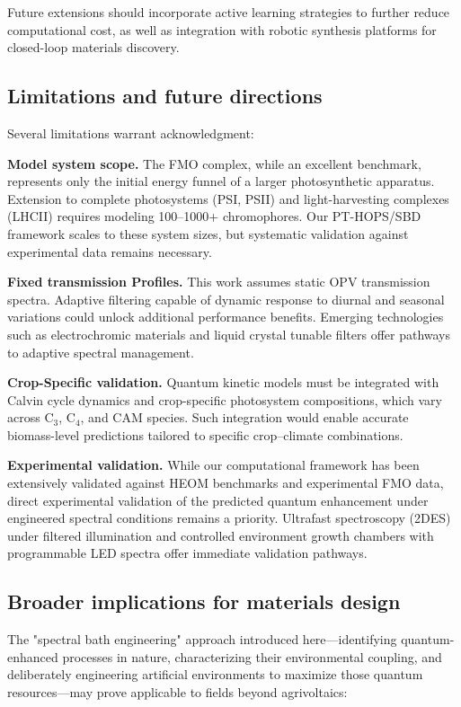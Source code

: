 Future extensions should incorporate active learning strategies to further reduce computational cost, as well as integration with robotic synthesis platforms for closed-loop materials discovery.

\subsection{Limitations and future directions}

Several limitations warrant acknowledgment:

\textbf{Model system scope.} The FMO complex, while an excellent benchmark, represents only the initial energy funnel of a larger photosynthetic apparatus. Extension to complete photosystems (PSI, PSII) and light-harvesting complexes (LHCII) requires modeling \numrange{100}{1000}+ chromophores. Our PT-HOPS/SBD framework scales to these system sizes, but systematic validation against experimental data remains necessary.

\textbf{Fixed transmission Profiles.} This work assumes static OPV transmission spectra. Adaptive filtering capable of dynamic response to diurnal and seasonal variations could unlock additional performance benefits. Emerging technologies such as electrochromic materials and liquid crystal tunable filters offer pathways to adaptive spectral management.

\textbf{Crop-Specific validation.} Quantum kinetic models must be integrated with Calvin cycle dynamics and crop-specific photosystem compositions, which vary across C$_3$, C$_4$, and CAM species. Such integration would enable accurate biomass-level predictions tailored to specific crop--climate combinations.

\textbf{Experimental validation.} While our computational framework has been extensively validated against HEOM benchmarks and experimental FMO data, direct experimental validation of the predicted quantum enhancement under engineered spectral conditions remains a priority. Ultrafast spectroscopy (2DES) under filtered illumination and controlled environment growth chambers with programmable LED spectra offer immediate validation pathways.

\subsection{Broader implications for materials design}

The "spectral bath engineering" approach introduced here---identifying quantum-enhanced processes in nature, characterizing their environmental coupling, and deliberately engineering artificial environments to maximize those quantum resources---may prove applicable to fields beyond agrivoltaics:

